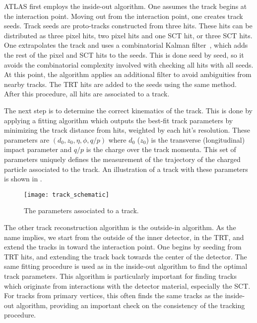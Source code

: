 ATLAS first employs the inside-out algorithm.
One assumes the track begins at the interaction point.
Moving out from the interaction point, one creates track seeds.
Track seeds are proto-tracks constructed from three hits.
These hits can be distributed as three pixel hits, two pixel hits and one SCT hit, or three SCT hits.
One extrapolates the track and uses a combinatorial Kalman filter~\cite{ATLAS-CONF-2012-042}, which adds the rest of the pixel and SCT hits to the seeds.
This is done seed by seed, so it avoids the combinatorial complexity involved with checking all hits with all seeds.
At this point, the algorithm applies an additional filter to avoid ambiguities from nearby tracks.
The TRT hits are added to the seeds using the same method.
After this procedure, all hits are associated to a track.

The next step is to determine the correct kinematics of the track.
This is done by applying a fitting algorithm which outputs the best-fit track parameters by minimizing the track distance from hits, weighted by each hit's resolution.
These parameters are $(d_0, z_0, \eta, \phi, q/p)$ where $d_0$ ($z_0$) is the transverse (longitudinal) impact parameter and $q/p$ is the charge over the track momenta.
This set of parameters uniquely defines the measurement of the trajectory of the charged particle associated to the track.
An illustration of a track with these parameters is shown in .

\begin{figure}
\caption{The parameters associated to a track.}
\label{fig:track_schematic}
\texttt{[image: track\_schematic]}
\end{figure}

The other track reconstruction algorithm is the outside-in algorithm.
As the name implies, we start from the outside of the inner detector, in the TRT, and extend the tracks in toward the interaction point.
One begins by seeding from TRT hits, and extending the track back towards the center of the detector.
The same fitting procedure is used as in the inside-out algorithm to find the optimal track parameters.
This algorithm is particularly important for finding tracks which originate from interactions with the detector material, especially the SCT.
For tracks from primary vertices, this often finds the same tracks as the inside-out algorithm, providing an important check on the consistency of the tracking procedure.

